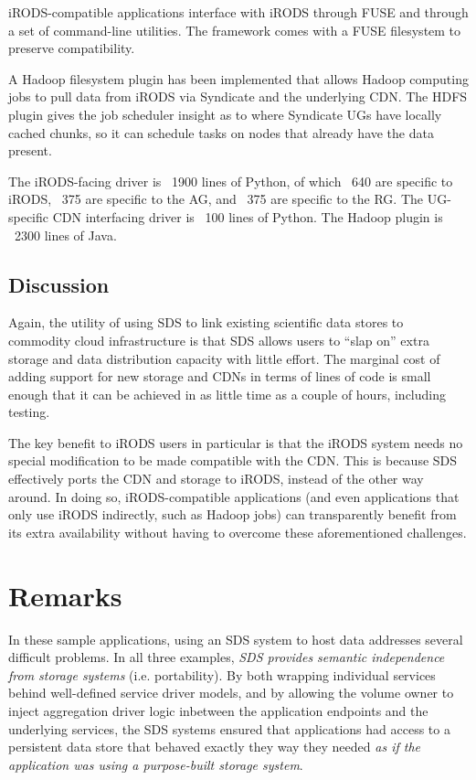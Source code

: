 iRODS-compatible applications interface with iRODS through FUSE and through a
set of command-line utilities.  The framework comes with a FUSE filesystem to preserve
compatibility.

A Hadoop filesystem plugin has been implemented that allows Hadoop
computing jobs to pull data from iRODS via Syndicate and the underlying CDN.
The HDFS plugin gives the job scheduler insight as to where Syndicate UGs have
locally cached chunks, so it can schedule tasks on nodes that already have the
data present.

The iRODS-facing driver is ~1900 lines of Python, of which ~640 are specific to
iRODS, ~375 are specific to the AG, and ~375 are specific to the RG.  The
UG-specific CDN interfacing driver is ~100 lines of Python.  The Hadoop plugin
is ~2300 lines of Java.

\subsection{Discussion}

Again, the utility of using SDS to link existing scientific data stores to
commodity cloud infrastructure is that SDS allows users to ``slap
on'' extra storage and data distribution capacity with little effort.  The
marginal cost of adding support for new storage and CDNs in terms of lines of
code is small enough that it can be achieved in as little time as a couple
of hours, including testing.

The key benefit to iRODS users in particular is that the iRODS system needs no
special modification to be made compatible with the CDN.  This is because
SDS effectively ports the CDN and storage to iRODS, instead of the other way around.
In doing so, iRODS-compatible applications (and even applications that only use
iRODS indirectly, such as Hadoop jobs) can transparently benefit from its extra
availability without having to overcome these aforementioned challenges.

\section{Remarks}

In these sample applications, using an SDS system to host data addresses
several difficult problems.  In all three examples, 
\emph{SDS provides semantic independence from storage systems} (i.e.
portability).  By both wrapping individual services behind well-defined service driver models, and by
allowing the volume owner to inject aggregation driver logic inbetween the
application endpoints and the underlying services, the SDS systems ensured that applications
had access to a persistent data store that behaved exactly they way they needed
\emph{as if the application was using a purpose-built storage system}.


